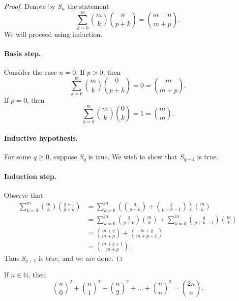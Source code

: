 \documentclass{exam}
\newcommand{\paren}[1]{\left(#1\right)}
\begin{document}
\begin{proof}
    Denote by $S_n$ the statement $$\sum_{k=0}^m\binom m k\binom{n}{p+k} = \binom{m+n}{m+p}.$$ We will proceed using induction.

    \paragraph{Basis step.} Consider the case $n = 0$. If $p>0$, then $$\sum_{k=0}^m\binom{m}k\binom0{p+k}=0=\binom{m}{m+p}.$$ If $p=0$, then $$\sum_{k=0}^m\binom m k\binom0k = 1 = \binom m m.$$

    \paragraph{Inductive hypothesis.} For some $q\ge0$, suppose $S_q$ is true. We wish to show that $S_{q+1}$ is true.

    \paragraph{Induction step.} Observe that
    \begin{align*}
        \sum_{k=0}^m\binom m k\binom{q+1}{p+k} &= \sum_{k=0}^m\paren{\binom{q}{p+k} + \binom{q}{p+k-1}}\binom m k\\
        &=\sum_{k=0}^m\binom{q}{p+k}\binom m k + \sum_{k=0}^m\binom{q}{p+k-1}\binom m k\\
        &=\binom{m+q}{m+p} + \binom{m+q}{m+p-1}\\
        &=\binom{m+q+1}{m+p}.
    \end{align*}
    Thus $S_{q+1}$ is true, and we are done.
\end{proof}

\begin{proposition}{10.40}
    If $n\in\mathbb N$, then $$\binom n 0^2 + \binom n 1^2 + \binom n 2^2 + \dots + \binom n n^2 = \binom{2n}n.$$
\end{proposition}
\end{document}
